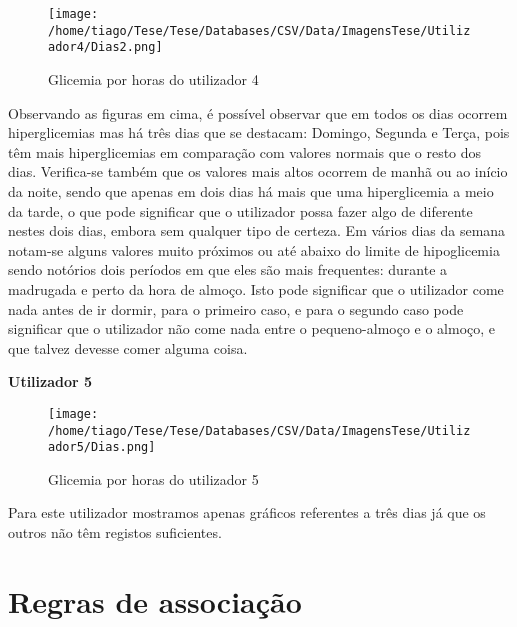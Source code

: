 \begin{figure}[H]
\centering
\texttt{[image: /home/tiago/Tese/Tese/Databases/CSV/Data/ImagensTese/Utilizador4/Dias2.png]}
\caption{Glicemia por horas do utilizador 4}
\end{figure}


Observando as figuras em cima, é possível observar que em todos os dias ocorrem hiperglicemias mas há três dias que se destacam: Domingo, Segunda e Terça, pois têm mais hiperglicemias em comparação com valores normais que o resto dos dias. Verifica-se também que os valores mais altos ocorrem de manhã ou ao início da noite, sendo que apenas em dois dias há mais que uma hiperglicemia a meio da tarde, o que pode significar que o utilizador possa fazer algo de diferente nestes dois dias, embora sem qualquer tipo de certeza. 
Em vários dias da semana notam-se alguns valores muito próximos ou até abaixo do limite de hipoglicemia sendo notórios dois períodos em que eles são mais frequentes: durante a madrugada e perto da hora de almoço. Isto pode significar que o utilizador come nada antes de ir dormir, para o primeiro caso, e para o segundo caso pode significar que o utilizador não come nada entre o pequeno-almoço e o almoço, e que talvez devesse comer alguma coisa. 


\textbf{Utilizador 5}

\begin{figure}[H]
\centering
\texttt{[image: /home/tiago/Tese/Tese/Databases/CSV/Data/ImagensTese/Utilizador5/Dias.png]}
\caption{Glicemia por horas do utilizador 5}
\end{figure}

Para este utilizador mostramos apenas gráficos referentes a três dias já que os outros não têm registos suficientes.



\section{Regras de associação}

